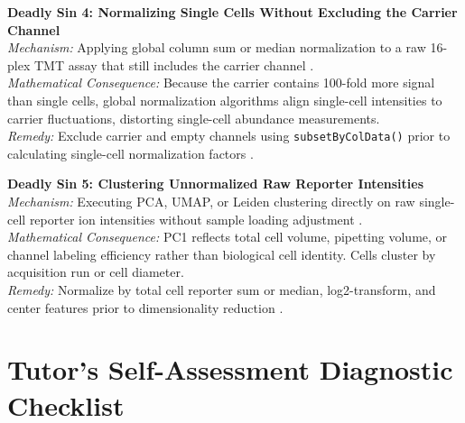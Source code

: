 \documentclass[11pt,twoside,openright]{book}
\begin{document}
\begin{pitfallbox}
\textbf{Deadly Sin 4: Normalizing Single Cells Without Excluding the Carrier Channel}\\
\textit{Mechanism:} Applying global column sum or median normalization to a raw 16-plex TMT assay that still includes the carrier channel \cite{vanderaa2024using}.\\
\textit{Mathematical Consequence:} Because the carrier contains 100-fold more signal than single cells, global normalization algorithms align single-cell intensities to carrier fluctuations, distorting single-cell abundance measurements.\\
\textit{Remedy:} Exclude carrier and empty channels using \texttt{subsetByColData()} prior to calculating single-cell normalization factors \cite{petelski2021multiplexed}.
\end{pitfallbox}

\begin{pitfallbox}
\textbf{Deadly Sin 5: Clustering Unnormalized Raw Reporter Intensities}\\
\textit{Mechanism:} Executing PCA, UMAP, or Leiden clustering directly on raw single-cell reporter ion intensities without sample loading adjustment \cite{specht2021single}.\\
\textit{Mathematical Consequence:} PC1 reflects total cell volume, pipetting volume, or channel labeling efficiency rather than biological cell identity. Cells cluster by acquisition run or cell diameter.\\
\textit{Remedy:} Normalize by total cell reporter sum or median, log2-transform, and center features prior to dimensionality reduction \cite{vanderaa2023scppackage}.
\end{pitfallbox}

\section{Tutor's Self-Assessment Diagnostic Checklist}
\end{document}
